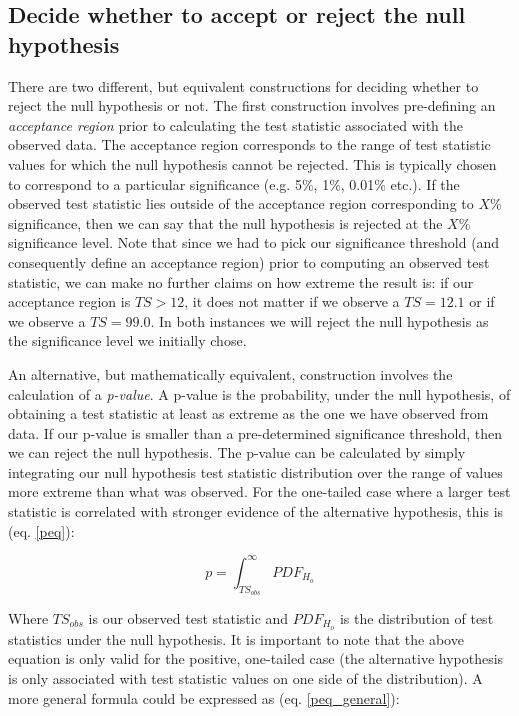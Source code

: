\subsection{Decide whether to accept or reject the null hypothesis}
There are two different, but equivalent constructions for deciding whether to reject the null hypothesis or not. The first construction involves pre-defining an \textit{acceptance region} prior to calculating the test statistic associated with the observed data. The acceptance region corresponds to the range of test statistic values for which the null hypothesis cannot be rejected. This is typically chosen to correspond to a particular significance (e.g. 5\%, 1\%, 0.01\% etc.). If the observed test statistic lies outside of the acceptance region corresponding to $X$\% significance, then we can say that the null hypothesis is rejected at the $X$\% significance level. Note that since we had to pick our significance threshold (and consequently define an acceptance region) prior to computing an observed test statistic, we can make no further claims on how extreme the result is: if our acceptance region is $TS > 12$, it does not matter if we observe a $TS = 12.1$ or if we observe a $TS = 99.0$. In both instances we will reject the null hypothesis as the significance level we initially chose. 

An alternative, but mathematically equivalent, construction involves the calculation of a \textit{p-value}. A p-value is the probability, under the null hypothesis, of obtaining a test statistic at least as extreme as the one we have observed from data. If our p-value is smaller than a pre-determined significance threshold, then we can reject the null hypothesis.  The p-value can be calculated by simply integrating our null hypothesis test statistic distribution over the range of values more extreme than what was observed. For the one-tailed case where a larger test statistic is correlated with stronger evidence of the alternative hypothesis, this is (eq. \ref{peq}): 

\begin{equation}
    p = \int_{TS_{obs}}^{\infty} PDF_{H_o}
\label{peq}    
\end{equation}

Where $TS_{obs}$ is our observed test statistic and $PDF_{H_o}$ is the distribution of test statistics under the null hypothesis. It is important to note that the above equation is only valid for the positive, one-tailed case (the alternative hypothesis is only associated with test statistic values on one side of the distribution). A more general formula could be expressed as (eq. \ref{peq_general}):

